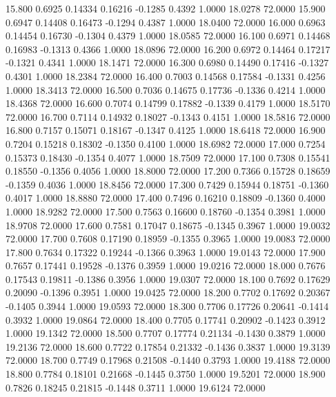   15.800   0.6925   0.14334   0.16216  -0.1285   0.4392   1.0000  18.0278  72.0000
  15.900   0.6947   0.14408   0.16473  -0.1294   0.4387   1.0000  18.0400  72.0000
  16.000   0.6963   0.14454   0.16730  -0.1304   0.4379   1.0000  18.0585  72.0000
  16.100   0.6971   0.14468   0.16983  -0.1313   0.4366   1.0000  18.0896  72.0000
  16.200   0.6972   0.14464   0.17217  -0.1321   0.4341   1.0000  18.1471  72.0000
  16.300   0.6980   0.14490   0.17416  -0.1327   0.4301   1.0000  18.2384  72.0000
  16.400   0.7003   0.14568   0.17584  -0.1331   0.4256   1.0000  18.3413  72.0000
  16.500   0.7036   0.14675   0.17736  -0.1336   0.4214   1.0000  18.4368  72.0000
  16.600   0.7074   0.14799   0.17882  -0.1339   0.4179   1.0000  18.5170  72.0000
  16.700   0.7114   0.14932   0.18027  -0.1343   0.4151   1.0000  18.5816  72.0000
  16.800   0.7157   0.15071   0.18167  -0.1347   0.4125   1.0000  18.6418  72.0000
  16.900   0.7204   0.15218   0.18302  -0.1350   0.4100   1.0000  18.6982  72.0000
  17.000   0.7254   0.15373   0.18430  -0.1354   0.4077   1.0000  18.7509  72.0000
  17.100   0.7308   0.15541   0.18550  -0.1356   0.4056   1.0000  18.8000  72.0000
  17.200   0.7366   0.15728   0.18659  -0.1359   0.4036   1.0000  18.8456  72.0000
  17.300   0.7429   0.15944   0.18751  -0.1360   0.4017   1.0000  18.8880  72.0000
  17.400   0.7496   0.16210   0.18809  -0.1360   0.4000   1.0000  18.9282  72.0000
  17.500   0.7563   0.16600   0.18760  -0.1354   0.3981   1.0000  18.9708  72.0000
  17.600   0.7581   0.17047   0.18675  -0.1345   0.3967   1.0000  19.0032  72.0000
  17.700   0.7608   0.17190   0.18959  -0.1355   0.3965   1.0000  19.0083  72.0000
  17.800   0.7634   0.17322   0.19244  -0.1366   0.3963   1.0000  19.0143  72.0000
  17.900   0.7657   0.17441   0.19528  -0.1376   0.3959   1.0000  19.0216  72.0000
  18.000   0.7676   0.17543   0.19811  -0.1386   0.3956   1.0000  19.0307  72.0000
  18.100   0.7692   0.17629   0.20090  -0.1396   0.3951   1.0000  19.0425  72.0000
  18.200   0.7702   0.17692   0.20367  -0.1405   0.3944   1.0000  19.0593  72.0000
  18.300   0.7706   0.17726   0.20641  -0.1414   0.3932   1.0000  19.0864  72.0000
  18.400   0.7705   0.17741   0.20902  -0.1423   0.3912   1.0000  19.1342  72.0000
  18.500   0.7707   0.17774   0.21134  -0.1430   0.3879   1.0000  19.2136  72.0000
  18.600   0.7722   0.17854   0.21332  -0.1436   0.3837   1.0000  19.3139  72.0000
  18.700   0.7749   0.17968   0.21508  -0.1440   0.3793   1.0000  19.4188  72.0000
  18.800   0.7784   0.18101   0.21668  -0.1445   0.3750   1.0000  19.5201  72.0000
  18.900   0.7826   0.18245   0.21815  -0.1448   0.3711   1.0000  19.6124  72.0000
